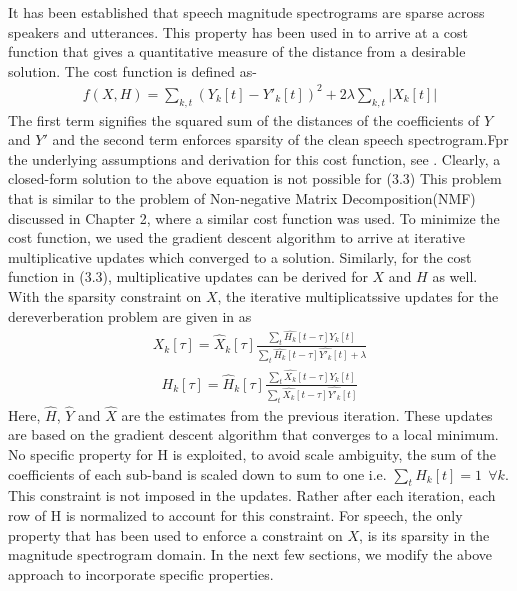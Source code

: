 It has been established that speech magnitude spectrograms are sparse across speakers and utterances. This property has been used in \cite{naka} \cite{moham}\cite{gamma} to arrive at a cost function that gives a quantitative measure of the distance from a desirable solution. The cost function is defined as- 
\begin{align} f(X,H) = \sum_{k,t} (Y_k[t] - Y'_k[t])^2 + 2 \lambda \sum_{k,t} |X_k[t]| \label{cost}
\end{align}
The first term signifies the squared sum of the distances of the coefficients of $Y$ and $Y'$ and the second term enforces sparsity of the clean speech spectrogram.Fpr the underlying assumptions and derivation for this cost function, see \cite{naka}. Clearly, a closed-form solution to the above equation is not possible for (3.3) This problem that is similar to the problem of Non-negative Matrix Decomposition(NMF) discussed in Chapter 2, where a similar cost function was used. To minimize the cost function, we used the gradient descent algorithm to arrive at iterative multiplicative updates which converged to a solution. Similarly, for the cost function in (3.3), multiplicative updates can be derived for $X$ and $H$ as well. With the sparsity constraint on $X$, the iterative multiplicatssive updates for the dereverberation problem are given in \cite{naka} as 
\begin{align}X_k[\tau] = \hat{X}_k[\tau]\frac{\sum_{t}\hat{H_k}[t-\tau]Y_k[t]}{\sum_{t}\hat{H_k}[t-\tau]\hat{Y'_k}[t] + \lambda} \label{X update}
\end{align}
\begin{align} H_k[\tau] = \hat{H}_k[\tau]\frac{\sum_{t}\hat{X_k}[t-\tau]Y_k[t]}{\sum_{t}\hat{X_k}[t-\tau]\hat{Y'_k}[t]} \label{H update}
\end{align}
Here, $\hat{H}$, $\hat{Y}$ and $\hat{X}$ are the estimates from the previous iteration. These updates are based on the gradient descent algorithm that converges to a local minimum. No specific property for H is exploited, to avoid scale ambiguity, the sum of the coefficients of each sub-band is scaled down to sum to one i.e. $\sum_{t}H_k[t] = 1 \ \ \forall k$. This constraint is not imposed in the updates. Rather after each iteration, each row of H is normalized to account for this constraint. For speech, the only property that has been used to enforce a constraint on $X$, is its sparsity in the magnitude spectrogram domain. In the next few sections, we modify the above approach to incorporate specific properties.


